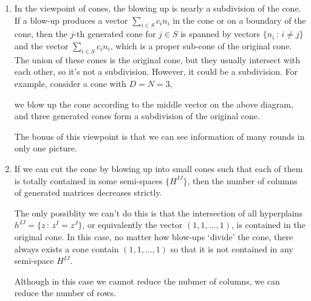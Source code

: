 \documentclass[12pt]{article}
\theoremstyle{definition}
\theoremstyle{plain}
\begin{document}
\begin{enumerate}
	\item In the viewpoint of cones, the blowing up is nearly a subdivision of the cone.
	If a blow-up produces a vector $\sum_{i\in S} c_i n_i$ in the cone 
	or on a boundary of the cone, then the $j$-th generated cone for $j\in S$ is spanned by 
	vectors $\{n_i\,:\,i\neq j\}$ and the vector $\sum_{i\in S} c_i n_i$,
	which is a proper sub-cone of the original cone. The union of these cones is the original cone,
	but they usually intersect with each other, so it's not a subdivision. 
	However, it could be a subdivision. For example, consider a cone with $D=N=3$,
	\begin{center}
	\end{center}
	we blow up the cone according to the middle vector on the above diagram, and
	three generated cones form a subdivision of the original cone.

	
	The bonus of this viewpoint is that we can see information of many rounds in only one picture.

	\item If we can cut the cone by blowing up into small cones such that 
	each of them is totally contained in some semi-spaces $\{H^{IJ}\}$, then
	the number of columns of generated matrices decreases strictly.

	The only possiblity we can't do this is that 
	the intersection of all hyperplains $h^{IJ}=\{z\,:\, z^I=z^J\}$, 
	or equivalently the vector $(1,1,\dots,1)$, 
	is contained in the original cone.
	In this case, no matter how blow-ups `divide' the cone, there always exists a cone contain
	$(1,1,\dots,1)$ so that it is not contained in any semi-space $H^{IJ}$.

	Although in this case we cannot reduce the nubmer of columns, we can reduce the number of rows.
\end{enumerate}
\end{document}
